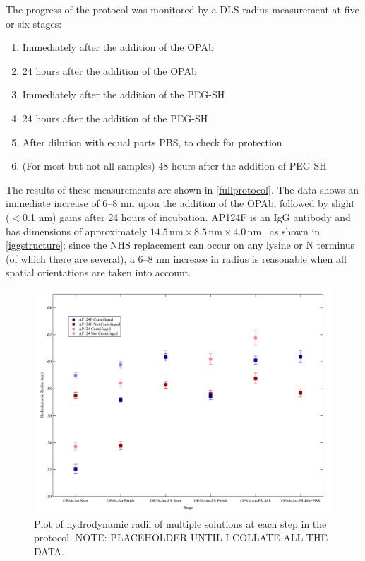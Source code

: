 The progress of the protocol was monitored by a DLS radius measurement at five or six stages:

\begin{enumerate}
\item Immediately after the addition of the OPAb

\item 24 hours after the addition of the OPAb

\item Immediately after the addition of the PEG-SH

\item 24 hours after the addition of the PEG-SH

\item After dilution with equal parts PBS, to check for protection

\item (For most but not all samples) 48 hours after the addition of PEG-SH

\end{enumerate}

The results of these measurements are shown in \autoref{fullprotocol}. The data shows an immediate increase of 6--8 nm upon the addition of the OPAb, followed by slight ($<$0.1 nm) gains after 24 hours of incubation. AP124F is an IgG antibody and has dimensions of approximately $14.5\mathrm{\,nm}\times8.5\mathrm{\,nm}\times4.0\mathrm{\,nm}$~\citep{antibodylength} as shown in \autoref{iggstructure};
since the NHS replacement can occur on any lysine or N terminus (of which there are several), a 6--8 nm increase in radius is reasonable when all spatial orientations are taken into account.

\begin{figure}[htbp]
\centering
\includegraphics[keepaspectratio,width=\textwidth,height=0.75\textheight]{2011DecPEGylation.pdf}
\caption{Plot of hydrodynamic radii of multiple solutions at each step in the protocol. NOTE: PLACEHOLDER UNTIL I COLLATE ALL THE DATA.}
\label{fullprotocol}
\end{figure}

